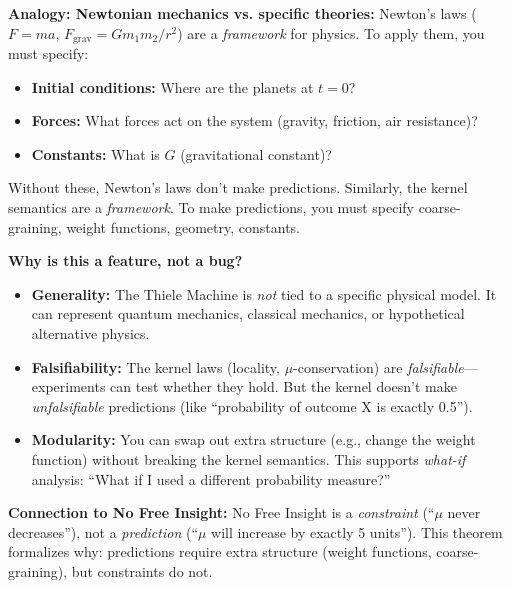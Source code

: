 \textbf{Analogy: Newtonian mechanics vs. specific theories:}
Newton's laws ($F = ma$, $F_{\text{grav}} = Gm_1 m_2 / r^2$) are a \textit{framework} for physics. To apply them, you must specify:
\begin{itemize}
    \item \textbf{Initial conditions:} Where are the planets at $t = 0$?
    \item \textbf{Forces:} What forces act on the system (gravity, friction, air resistance)?
    \item \textbf{Constants:} What is $G$ (gravitational constant)?
\end{itemize}
Without these, Newton's laws don't make predictions. Similarly, the kernel semantics are a \textit{framework}. To make predictions, you must specify coarse-graining, weight functions, geometry, constants.

\textbf{Why is this a feature, not a bug?}
\begin{itemize}
    \item \textbf{Generality:} The Thiele Machine is \textit{not} tied to a specific physical model. It can represent quantum mechanics, classical mechanics, or hypothetical alternative physics.
    
    \item \textbf{Falsifiability:} The kernel laws (locality, $\mu$-conservation) are \textit{falsifiable}---experiments can test whether they hold. But the kernel doesn't make \textit{unfalsifiable} predictions (like ``probability of outcome X is exactly 0.5'').
    
    \item \textbf{Modularity:} You can swap out extra structure (e.g., change the weight function) without breaking the kernel semantics. This supports \textit{what-if} analysis: ``What if I used a different probability measure?''
\end{itemize}

\textbf{Connection to No Free Insight:} No Free Insight is a \textit{constraint} (``$\mu$ never decreases''), not a \textit{prediction} (``$\mu$ will increase by exactly 5 units''). This theorem formalizes why: predictions require extra structure (weight functions, coarse-graining), but constraints do not.

